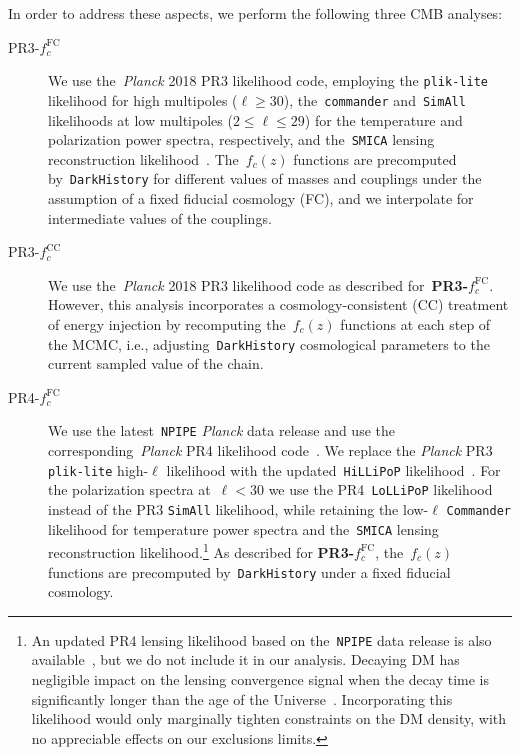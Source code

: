 In order to address these aspects, we perform the following three CMB analyses:
\begin{description}
\item[PR3-$f^\mathrm{FC}_c$]
  We use the~\textit{Planck} 2018 PR3 likelihood code, employing the \texttt{plik-lite} likelihood for high multipoles ($\ell \geq 30$), the~\texttt{commander} and~\texttt{SimAll} likelihoods at low multipoles ($2 \leq \ell \leq 29$) for the temperature and polarization power spectra, respectively, and the~\texttt{SMICA} lensing reconstruction likelihood~\cite{Planck:2019nip}.
  The~$f_c(z)$ functions are precomputed by~\texttt{DarkHistory} for different values of masses and couplings under the assumption of a fixed fiducial cosmology (FC), and we interpolate for intermediate values of the couplings.
\item[PR3-$f^\mathrm{CC}_c$]
  We use the~\textit{Planck} 2018 PR3 likelihood code as described for~\textbf{PR3-$f^\mathrm{FC}_c$}.
  However, this analysis incorporates a cosmology-consistent (CC) treatment of energy injection by recomputing the~$f_c(z)$ functions at each step of the MCMC, i.e., adjusting~\texttt{DarkHistory} cosmological parameters to the current sampled value of the chain.
\item[PR4-$f^\mathrm{FC}_c$]
  We use the latest~\texttt{NPIPE} \textit{Planck} data release and use the corresponding~\textit{Planck} PR4 likelihood code~\cite{Planck:2020olo}.
  We replace the \textit{Planck} PR3 \texttt{plik-lite} high-$\ell$ likelihood with the updated~\texttt{HiLLiPoP} likelihood~\cite{Tristram:2023haj}.
  For the polarization spectra at~$\ell < 30$ we use the PR4~\texttt{LoLLiPoP} likelihood~\cite{Tristram:2023haj} instead of the PR3 \texttt{SimAll} likelihood, while retaining the low-$\ell$ \texttt{Commander} likelihood for temperature power spectra and the~\texttt{SMICA} lensing reconstruction likelihood.\footnote{An updated PR4 lensing likelihood based on the~\texttt{NPIPE} data release is also available~\cite{Carron:2022eyg}, but we do not include it in our analysis. Decaying DM has negligible impact on the lensing convergence signal when the decay time is significantly longer than the age of the Universe~\cite{Li:2018zdm}. Incorporating this likelihood would only marginally tighten constraints on the DM density, with no appreciable effects on our exclusions limits.}
  As described for \textbf{PR3-$f^\mathrm{FC}_c$}, the~$f_c(z)$ functions are precomputed by~\texttt{DarkHistory} under a fixed fiducial cosmology.
\end{description}

